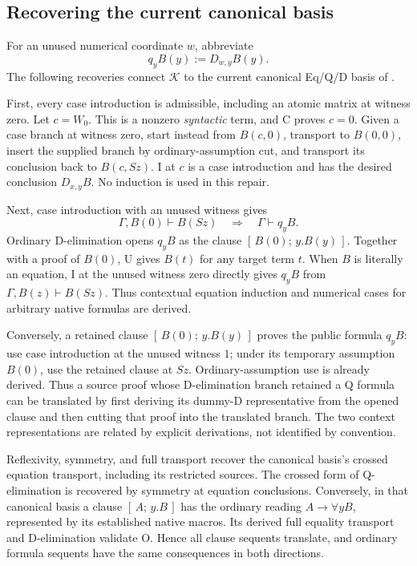 \documentclass[11pt]{article}
\theoremstyle{definition}\newtheorem{definition}[theorem]{Definition}
\newcommand{\K}{\mathcal K}
\newcommand{\cl}[2]{[\,#1;\,#2\,]}
\begin{document}
\subsection{Recovering the current canonical basis}

For an unused numerical coordinate $w$, abbreviate
\[
 q_yB(y):=D_{w,y}B(y).
\]
The following recoveries connect $\K$ to the current canonical
Eq/Q/D basis of \cite{canonical}.

First, every case introduction is admissible, including an atomic
matrix at witness zero. Let $c=W_0$. This is a nonzero \emph{syntactic}
term, and C proves $c=0$. Given a case branch at witness zero, start
instead from $B(c,0)$, transport to $B(0,0)$, insert the supplied
branch by ordinary-assumption cut, and transport its conclusion back
to $B(c,Sz)$. I at $c$ is a case introduction and has the desired
conclusion $D_{x,y}B$. No induction is used in this repair.

Next, case introduction with an unused witness gives
\[
 \Gamma,B(0)\vdash B(Sz)\quad\Longrightarrow\quad\Gamma\vdash q_yB.
\]
Ordinary D-elimination opens $q_yB$ as the clause
$\cl{B(0)}{y.B(y)}$. Together with a proof of $B(0)$, U gives $B(t)$
for any target term $t$. When $B$ is literally an equation, I at the
unused witness zero directly gives $q_yB$ from
$\Gamma,B(z)\vdash B(Sz)$. Thus contextual equation induction and
numerical cases for arbitrary native formulas are derived.

Conversely, a retained clause $\cl{B(0)}{y.B(y)}$ proves the public
formula $q_yB$: use case introduction at the unused witness $1$;
under its temporary assumption $B(0)$, use the retained clause at
$Sz$. Ordinary-assumption use is already derived. Thus a source proof
whose D-elimination branch retained a Q formula can be translated by
first deriving its dummy-D representative from the opened clause and
then cutting that proof into the translated branch. The two context
representations are related by explicit derivations, not identified
by convention.

Reflexivity, symmetry, and full transport recover the canonical
basis's crossed equation transport, including its restricted sources.
The crossed form of Q-elimination is recovered by symmetry at equation
conclusions. Conversely, in that canonical basis a clause
$\cl{A}{y.B}$ has the ordinary reading $A\to\forall y B$, represented
by its established native macros. Its derived full equality transport
and D-elimination validate O. Hence all clause sequents translate, and
ordinary formula sequents have the same consequences in both directions.
\end{document}
